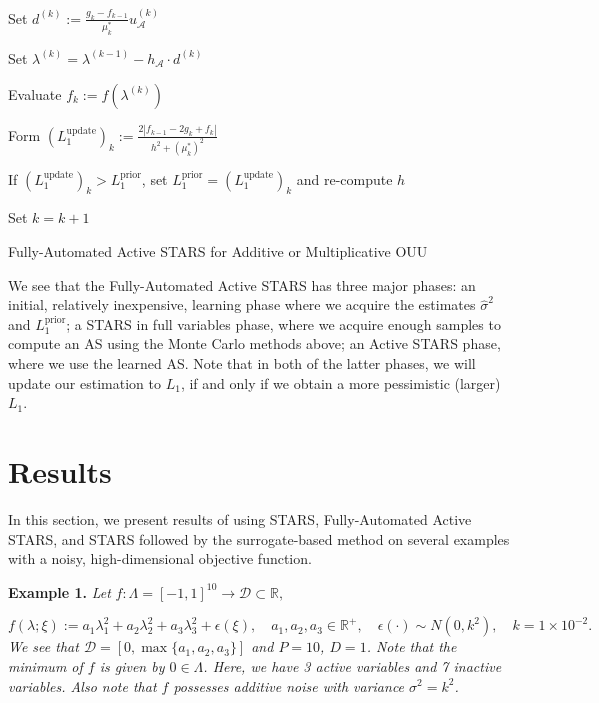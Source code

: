 \documentclass{amsart}
\newcommand{\D}{\mathcal{D}}
\newcommand{\A}{\mathcal{A}}
\newcommand{\R}{\mathbb{R}}
\begin{document}
\begin{algorithm}[H]
{  Set $ d^{(k)}:=\frac{g_k-f_{k-1}}{\mu^*_k}u_\A^{(k)}$\;
  
  Set $\lambda^{(k)}=\lambda^{(k-1)}-h_\A\cdot d^{(k)}$\;
  
  Evaluate $f_k:=f(\lambda^{(k)})$\;
  
    Form $(L_1^\text{update})_k:=\frac{2|f_{k-1}-2g_k +f_k|}{h^2+(\mu^*_k)^2}$\;
  
  If $(L_1^\text{update})_k>L_1^\text{prior}$, set $L_1^\text{prior}=(L_1^\text{update})_k$ and re-compute $h$\;
  
  Set $k=k+1$\;}


	\caption{Fully-Automated Active STARS for Additive or Multiplicative OUU}

\end{algorithm}

\vspace{.25cm}

We see that the Fully-Automated Active STARS has three major phases: an initial, relatively inexpensive, learning phase where we acquire the estimates $\hat{\sigma}^2$ and $L_1^\text{prior}$; a STARS in full variables phase, where we acquire enough samples to compute an AS using the Monte Carlo methods above; an Active STARS phase, where we use the learned AS. Note that in both of the latter phases, we will update our estimation to $L_1$, if and only if we obtain a more pessimistic (larger) $L_1$.



\section{Results}

In this section, we present results of using STARS, Fully-Automated Active STARS, and STARS followed by the surrogate-based method on several examples with a noisy, high-dimensional objective function.

\noindent \textbf{Example 1.} \textit{Let} $f: \Lambda=[-1,1]^{10} \to \D \subset \mathbb{R},$ 

$$f(\lambda; \xi):=a_1\lambda_{1}^2+a_2\lambda_{2}^2+a_3\lambda_{3}^2 + \epsilon(\xi), \quad a_1,a_2,a_3 \in \R^+, \quad \epsilon(\cdot) \sim N(0,k^2), \quad k=1 \times 10^{-2}.$$ \textit{We see that $\mathcal{D}=[0,\max\{a_1,a_2,a_3\}]$ and $P=10$, $D=1$. Note that the minimum of $f$ is given by $0 \in \Lambda$. Here, we have 3 active variables and 7 inactive variables. Also note that $f$ possesses additive noise with variance $\sigma^2=k^2$.}
\end{document}
